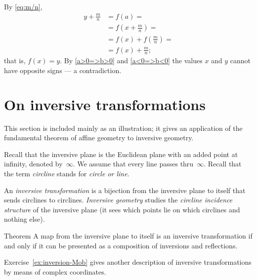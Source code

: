 By \ref{eq:m/n},
\begin{align*}
y+\tfrac{m}{n}&=f(a)=
\\
&=f(x+\tfrac{m}{n})=
\\
&=f(x)+f(\tfrac{m}{n})=
\\
&=f(x)+\tfrac{m}{n};
\end{align*}
that is, $f(x)=y$.
By \ref{a>0=>b>0} and \ref{a<0=>b<0} the values $x$ and $y$ cannot have opposite signs --- a contradiction.
\qeds




\section{On inversive transformations}

This section is included mainly as an illustration;
it gives an application of the fundamental theorem of affine geometry to inversive geometry.

Recall that the inversive plane is the Euclidean plane with an added point at infinity, denoted by~$\infty$.
We assume that every line passes thru~$\infty$.
Recall that the term {}\emph{circline} stands for \textit{circle or line}.

An \emph{inversive transformation} is a bijection from the inversive plane to itself that sends circlines to circlines.
{}\emph{Inversive geometry} studies the {}\emph{circline incidence structure} of the inversive plane
(it sees which points lie on which circlines and nothing else).

\begin{thm}{Theorem}\label{thm:inversions-inversive}
A map from the inversive plane to itself is an inversive transformation
if and only if it can be presented as a composition of inversions and reflections.  
\end{thm}

Exercise~\ref{ex:inversion-Mob} gives another description of inversive transformations by means of complex coordinates.

